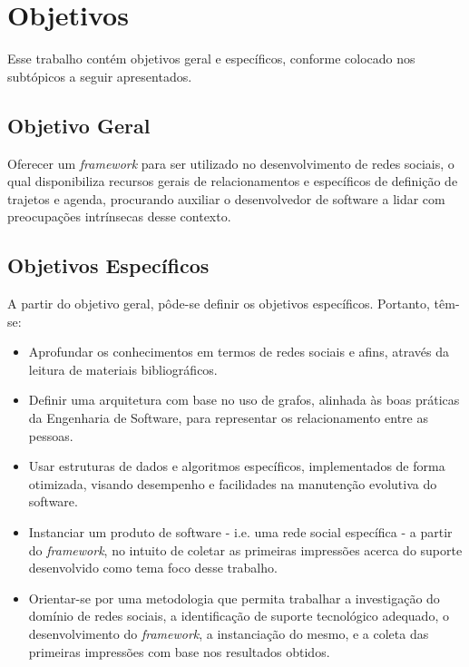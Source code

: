 \section{Objetivos}

Esse trabalho contém objetivos geral e específicos, conforme colocado nos subtópicos a seguir apresentados.

\subsection{Objetivo Geral}

Oferecer um \textit{framework} para ser utilizado no desenvolvimento de redes sociais, o qual disponibiliza recursos gerais de relacionamentos e específicos de definição de trajetos e agenda, procurando auxiliar o desenvolvedor de software a lidar com preocupações intrínsecas desse contexto.

\subsection{Objetivos Específicos}

A partir do objetivo geral, pôde-se definir os objetivos específicos. Portanto, têm-se:

\begin{itemize}
	\item Aprofundar os conhecimentos em termos de redes sociais e afins, através da leitura de materiais bibliográficos.
	\item Definir uma arquitetura com base no uso de grafos, alinhada às boas práticas da Engenharia de Software, para representar os relacionamento entre as pessoas.
	\item Usar estruturas de dados e algoritmos específicos, implementados de forma otimizada, visando desempenho e facilidades na manutenção evolutiva do software.
	\item Instanciar um produto de software - i.e. uma rede social específica - a partir do \textit{framework}, no intuito de coletar as primeiras impressões acerca do suporte desenvolvido como tema foco desse trabalho.
	\item Orientar-se por uma metodologia que permita trabalhar a investigação do domínio de redes sociais, a identificação de suporte tecnológico adequado, o desenvolvimento do \textit{framework}, a instanciação do mesmo, e a coleta das primeiras impressões com base nos resultados obtidos.
\end{itemize}

